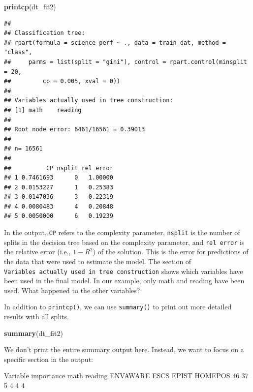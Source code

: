 \documentclass[]{book}
\newenvironment{Shaded}{\begin{snugshade}}{\end{snugshade}}
\newcommand{\DecValTok}[1]{\textcolor[rgb]{0.00,0.00,0.81}{#1}}
\newcommand{\KeywordTok}[1]{\textcolor[rgb]{0.13,0.29,0.53}{\textbf{#1}}}
\newcommand{\NormalTok}[1]{#1}
\begin{document}
\begin{Shaded}
\begin{Highlighting}[]
\KeywordTok{printcp}\NormalTok{(dt_fit2)}
\end{Highlighting}
\end{Shaded}

\begin{verbatim}
## 
## Classification tree:
## rpart(formula = science_perf ~ ., data = train_dat, method = "class", 
##     parms = list(split = "gini"), control = rpart.control(minsplit = 20, 
##         cp = 0.005, xval = 0))
## 
## Variables actually used in tree construction:
## [1] math    reading
## 
## Root node error: 6461/16561 = 0.39013
## 
## n= 16561 
## 
##          CP nsplit rel error
## 1 0.7461693      0   1.00000
## 2 0.0153227      1   0.25383
## 3 0.0147036      3   0.22319
## 4 0.0080483      4   0.20848
## 5 0.0050000      6   0.19239
\end{verbatim}

In the output, \texttt{CP} refers to the complexity parameter, \texttt{nsplit} is the number of splits in the decision tree based on the complexity parameter, and \texttt{rel\ error} is the relative error (i.e., \(1 - R^2\)) of the solution. This is the error for predictions of the data that were used to estimate the model. The section of \texttt{Variables\ actually\ used\ in\ tree\ construction} shows which variables have been used in the final model. In our example, only math and reading have been used. What happened to the other variables?

In addition to \texttt{printcp()}, we can use \texttt{summary()} to print out more detailed results with all splits.

\begin{Shaded}
\begin{Highlighting}[]
\KeywordTok{summary}\NormalTok{(dt_fit2)}
\end{Highlighting}
\end{Shaded}

We don't print the entire summary output here. Instead, we want to focus on a specific section in the output:

\begin{Shaded}
\begin{Highlighting}[]
\NormalTok{Variable importance}
\NormalTok{    math  reading ENVAWARE     ESCS    EPIST  HOMEPOS }
      \DecValTok{46}       \DecValTok{37}        \DecValTok{5}        \DecValTok{4}        \DecValTok{4}        \DecValTok{4}  
\end{Highlighting}
\end{Shaded}
\end{document}
